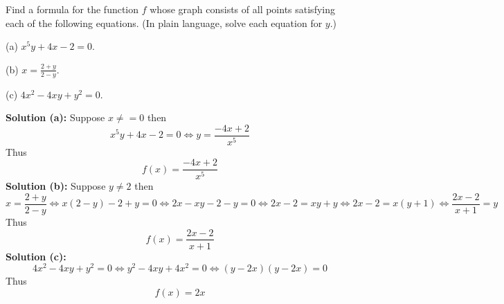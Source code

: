 \begin{tcolorbox}[title=Problem 21, breakable]
    Find a formula for the function $f$ whose graph consists of all points
        satisfying each of the following equations.
    (In plain language, solve each equation for $y$.)

    (a) $x^5 y + 4x - 2 = 0$.

    (b) $x = \frac{2 + y}{2 - y}$.

    (c) $4x^2 - 4xy + y^2 = 0$.
\end{tcolorbox}

\textbf{Solution (a):}
Suppose $x \ne = 0$ then
\[x^5 y + 4x - 2 = 0 \iff y = \frac{-4x + 2}{x^5}\]
Thus 
\[f(x) = \frac{-4x + 2}{x^5}\]
\textbf{Solution (b):}
Suppose $y \ne 2$ then 
\[x = \frac{2 + y}{2 - y} \iff x(2 - y) - 2 + y = 0 \iff 2x - xy - 2 - y = 0 \iff 2x -2 = xy + y \iff 2x - 2 = x(y + 1) \iff \frac{2x - 2}{x + 1} = y\]
Thus 
\[f(x) = \frac{2x - 2}{x + 1}\]
\textbf{Solution (c):}
\[4x^2 - 4xy + y^2 = 0 \iff y^2 - 4xy + 4x^2 = 0 \iff (y - 2x)(y - 2x) = 0\]
Thus
\[f(x) = 2x\]